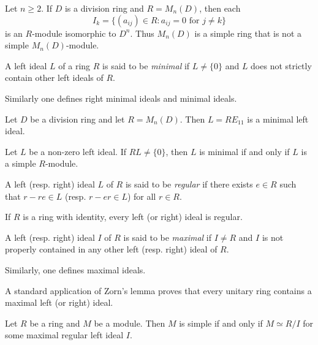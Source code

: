 \begin{example}
	\label{exa:I_k}
	Let $n\geq2$.  If $D$ is a division ring and $R=M_n(D)$, then each 
	\[
	I_k=\{ (a_{ij})\in R:a_{ij}=0\text{ for $j\ne k$}\}
	\]
	is an $R$-module isomorphic to $D^n$. 
	Thus $M_{n}(D)$ is a simple ring that is not a simple $M_n(D)$-module.
\end{example}

\begin{definition}
A left ideal $L$ of a ring $R$ is said to be \emph{minimal} if $L\ne\{0\}$ and 
$L$ does not strictly contain other left ideals of $R$. 
\end{definition}

Similarly one defines
right minimal ideals and minimal ideals. 

\begin{example}
	Let $D$ be a division ring and let $R=M_n(D)$. Then $L=RE_{11}$ 
	is a minimal left ideal.
\end{example}

\begin{example}
	Let $L$ be a non-zero left ideal. If $RL\ne\{0\}$, then
	$L$ is minimal if and only if $L$ is a simple $R$-module. 
\end{example}

\begin{definition}
\label{def:regular}
A left (resp. right) ideal $L$ of $R$ is said to be \emph{regular} if
there exists $e\in R$ such that $r-re\in L$ (resp.  $r-er\in L$) for all $r\in R$.
\end{definition}

If $R$ is a ring with identity, every left (or right) ideal is regular. 

\begin{definition}
A left (resp. right) ideal $I$ of $R$ is said to be \emph{maximal} if $I\ne R$ and $I$ is not properly contained 
in any other left (resp. right) ideal of $R$. 
\end{definition}

Similarly, one defines maximal ideals. 

A standard application of Zorn's lemma proves 
that every unitary ring contains a maximal left (or right) ideal.  

\begin{proposition}
	\label{proposition:R/I}
	Let $R$ be a ring and $M$ be a module. Then $M$ is simple if and only if
	$M\simeq R/I$ for some maximal regular left ideal $I$. 	
\end{proposition}


